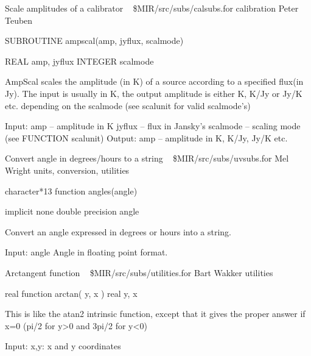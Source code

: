 %
\noindent Scale amplitudes of a calibrator
\newline \ 
\newline {} \$MIR/src/subs/calsubs.for
\newline {} calibration
\newline {} Peter Teuben
\par{\tenpoint
{\eightpoint\begintt
        SUBROUTINE ampscal(amp, jyflux, scalmode)

        REAL    amp, jyflux
        INTEGER scalmode

   AmpScal scales the amplitude (in K) of a source according
   to a specified flux(in Jy). The input is usually in K,
   the output amplitude is either K, K/Jy or Jy/K etc.
   depending on the scalmode (see scalunit for valid scalmode's)

   Input:
       amp      --  amplitude in K
       jyflux   --  flux in Jansky's
       scalmode --  scaling mode (see FUNCTION scalunit)
   Output:
       amp      --  amplitude in K, K/Jy, Jy/K etc.
\endtt}
\par}
%
\noindent Convert angle in degrees/hours to a string
\newline \ 
\newline {} \$MIR/src/subs/uvsubs.for
\newline {} Mel Wright
\newline \abox{Keywords:} units, conversion, utilities
\par{\tenpoint
{\eightpoint\begintt
        character*13 function angles(angle)

        implicit none
        double precision angle

  Convert an angle expressed in degrees or hours into a string.

  Input:
    angle      Angle in floating point format.
\endtt}
\par}
%
\noindent Arctangent function
\newline \ 
\newline {} \$MIR/src/subs/utilities.for
\newline \abox{Responsible:} Bart Wakker
\newline {} utilities
\par{\tenpoint
{\eightpoint\begintt
      real   function arctan( y, x )
      real   y, x

 This is like the atan2 intrinsic function, except that it gives the proper
 answer if x=0 (pi/2 for y>0 and 3pi/2 for y<0)

 Input:
   x,y:     x and y coordinates
\endtt}
\par}

